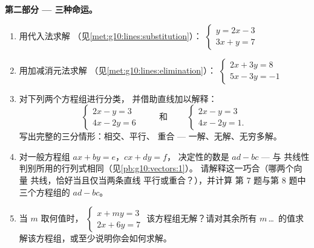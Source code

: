 \begin{problem}
\medskip
\noindent\textbf{第二部分 --- 三种命运。}
\begin{enumerate}[resume]
  \item 用代入法求解
        （见\cref{met:g10:lines:substitution}）：
        $\begin{cases} y = 2x - 3 \\ 3x + y = 7 \end{cases}$
  \item 用加减消元法求解
        （见\cref{met:g10:lines:elimination}）：
        $\begin{cases} 2x + 3y = 8 \\ 5x - 3y = -1 \end{cases}$
  \item 对下列两个方程组进行分类，
        并借助直线加以解释：
        \[
        \begin{cases} 2x - y = 3 \\ 4x - 2y = 6 \end{cases}
        \qquad\text{ 和 }\qquad
        \begin{cases} 2x - y = 3 \\ 4x - 2y = 1 . \end{cases}
        \]
        写出完整的三分情形：相交、平行、
        重合 --- 一解、无解、无穷多解。
  \item 对一般方程组 $ax + by = e$，$cx + dy = f$，
        决定性的数是 $ad - bc$ --- 与
        共线性判别所用的行列式相同（见\cref{pb:g10:vectors:1}）。
        请解释这一巧合（哪两个向量
        共线，恰好当且仅当两条直线
        平行或重合？），并计算
        第 7 题与第 8 题中三个方程组的 $ad - bc$。
  \item 当 $m$ 取何值时，
        $\begin{cases} x + my = 3 \\ 2x + 6y = 7 \end{cases}$
        该方程组无解？请对其余所有
        $m$\,\dots\ 的值求解该方程组，或至少说明你会如何求解。
\end{enumerate}


\end{problem}
